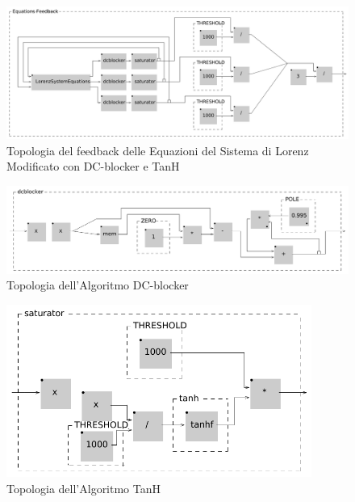 \begin{figure}[h!]
\begin{center}
    \includegraphics[width=14cm]{figures/LorenzSystemFB2.pdf}
    \caption{Topologia del feedback delle Equazioni del Sistema di Lorenz Modificato con DC-blocker e TanH}  
\end{center}
\end{figure}

\begin{figure}[h!] 
\begin{center}
    \includegraphics[width=14cm]{figures/DCblocker.pdf}
    \caption{Topologia dell'Algoritmo DC-blocker} 
\end{center}
\end{figure}

\begin{figure}[h!] 
\begin{center}
    \includegraphics[width=10cm]{figures/Saturator.pdf}
    \caption{Topologia dell'Algoritmo TanH} 
\end{center}
\end{figure}

